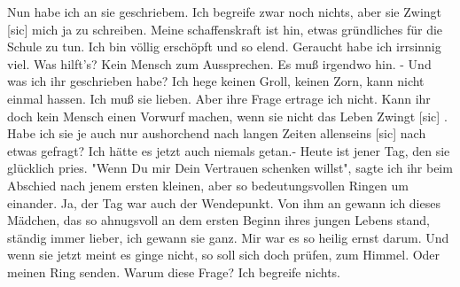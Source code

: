 \def\day{17. Mai 1944 15\begin{math}^{hmt}\end{math}}
\mktitle

Nun habe ich an sie geschriebem.
Ich begreife zwar noch nichts, aber sie Zwingt{\color{red} [sic] } mich ja zu schreiben.
Meine schaffenskraft ist hin, etwas gr\"{u}ndliches f\"{u}r die Schule zu tun.
Ich bin v\"{o}llig ersch\"{o}pft und so elend.
Geraucht habe ich irrsinnig viel.
Was hilft's?
Kein Mensch zum Aussprechen.
Es mu{\ss} irgendwo hin.
- Und was ich ihr geschrieben habe?
Ich hege keinen Groll, keinen Zorn, kann nicht einmal hassen.
Ich mu{\ss} sie lieben.
Aber ihre Frage ertrage ich nicht.
Kann ihr doch kein Mensch einen Vorwurf machen, wenn sie nicht das Leben Zwingt{\color{red} [sic] }.
Habe ich sie je auch nur aushorchend nach langen Zeiten allenseins{\color{red} [sic] } nach etwas gefragt?
Ich h\"{a}tte es jetzt auch niemals getan.-
Heute ist jener Tag, den sie gl\"{u}cklich pries.
"Wenn Du mir Dein Vertrauen schenken willst", sagte ich ihr beim Abschied nach jenem ersten kleinen, aber so bedeutungsvollen Ringen um einander.
Ja, der Tag war auch der Wendepunkt.
Von ihm an gewann ich dieses M\"{a}dchen, das so ahnugsvoll an dem ersten Beginn ihres jungen Lebens stand, st\"{a}ndig immer lieber, ich gewann sie ganz.
Mir war es so heilig ernst darum.
Und wenn sie jetzt meint es ginge nicht, so soll sich doch pr\"{u}fen, zum Himmel.
Oder meinen Ring senden.
Warum diese Frage?
Ich begreife nichts.

\clearpage
